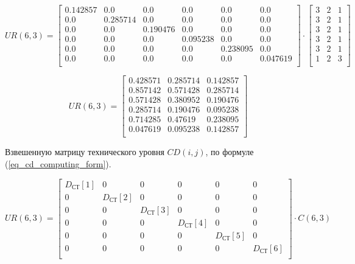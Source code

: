$$
    UR(6,3) =
        \begin{bmatrix}
            0.142857 & 0.0      & 0.0      & 0.0      & 0.0      & 0.0      \\
            0.0      & 0.285714 & 0.0      & 0.0      & 0.0      & 0.0      \\
            0.0      & 0.0      & 0.190476 & 0.0      & 0.0      & 0.0      \\
            0.0      & 0.0      & 0.0      & 0.095238 & 0.0      & 0.0      \\
            0.0      & 0.0      & 0.0      & 0.0      & 0.238095 & 0.0      \\
            0.0      & 0.0      & 0.0      & 0.0      & 0.0      & 0.047619 \\
        \end{bmatrix}
        \cdot
        \begin{bmatrix}
            3 & 2 & 1 \\
            3 & 2 & 1 \\
            3 & 2 & 1 \\
            3 & 2 & 1 \\
            3 & 2 & 1 \\
            1 & 2 & 3 \\
        \end{bmatrix}
$$

\begin{equation}
    UR(6,3) =
        \begin{bmatrix}
            0.428571 & 0.285714 & 0.142857 \\
            0.857142 & 0.571428 & 0.285714 \\
            0.571428 & 0.380952 & 0.190476 \\
            0.285714 & 0.190476 & 0.095238 \\
            0.714285 & 0.47619  & 0.238095 \\
            0.047619 & 0.095238 & 0.142857 \\
        \end{bmatrix}
    \label{eq_ur_rez}
\end{equation}

Взвешенную матрицу технического уровня $CD(i, j)$, по формуле
(\ref{eq_cd_computing_form}).

\begin{equation}
    UR(6,3) =
        \begin{bmatrix}
            D_\text{СТ}[1] & 0 & 0 & 0 & 0 & 0 \\
            0 & D_\text{СТ}[2] & 0 & 0 & 0 & 0 \\
            0 & 0 & D_\text{СТ}[3] & 0 & 0 & 0 \\
            0 & 0 & 0 & D_\text{СТ}[4] & 0 & 0 \\
            0 & 0 & 0 & 0 & D_\text{СТ}[5] & 0 \\
            0 & 0 & 0 & 0 & 0 & D_\text{СТ}[6] \\
        \end{bmatrix}
        \cdot
        C(6,3)
    \label{eq_cd_computing_form}
\end{equation}

